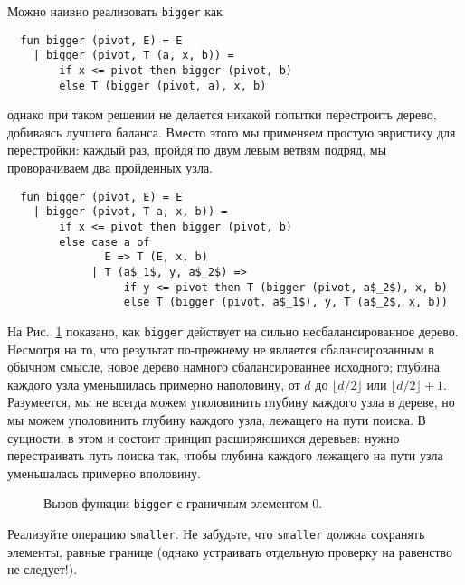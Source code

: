 Можно наивно реализовать \lstinline!bigger! как
\begin{lstlisting}
  fun bigger (pivot, E) = E
    | bigger (pivot, T (a, x, b)) =
        if x <= pivot then bigger (pivot, b)
        else T (bigger (pivot, a), x, b)
\end{lstlisting}
однако при таком решении не делается никакой попытки перестроить
дерево, добиваясь лучшего баланса.  Вместо этого мы применяем простую
эвристику для перестройки: каждый раз, пройдя по двум левым ветвям
подряд, мы проворачиваем два пройденных узла.
\begin{lstlisting}
  fun bigger (pivot, E) = E
    | bigger (pivot, T a, x, b)) =
        if x <= pivot then bigger (pivot, b)
        else case a of
               E => T (E, x, b)
             | T (a$_1$, y, a$_2$) =>
                  if y <= pivot then T (bigger (pivot, a$_2$), x, b)
                  else T (bigger (pivot. a$_1$), y, T (a$_2$, x, b))
\end{lstlisting}
На Рис.~\ref{fig:5.4} показано, как \lstinline!bigger! действует на
сильно несбалансированное дерево. Несмотря на то, что результат
по-прежнему не является сбалансированным в обычном смысле, новое
дерево намного сбалансированнее исходного; глубина каждого узла
уменьшилась примерно наполовину, от $d$ до $\lfloor d/2 \rfloor$ или
$\lfloor d/2 \rfloor + 1$. Разумеется, мы не всегда можем уполовинить
глубину каждого узла в дереве, но мы можем уполовинить глубину каждого
узла, лежащего на пути поиска. В сущности, в этом и состоит принцип
расширяющихся деревьев: нужно перестраивать путь поиска так, чтобы
глубина каждого лежащего на пути узла уменьшалась примерно вполовину.

\begin{figure}
  \centering
  
  \caption{Вызов функции \lstinline!bigger! с граничным элементом 0.}
  \label{fig:5.4}
\end{figure}

\begin{exercise}\label{ex:5.4}
  Реализуйте операцию \lstinline!smaller!. Не забудьте, что
  \lstinline!smaller! должна сохранять элементы, равные границе (однако
   устраивать отдельную проверку на равенство не следует!).
\end{exercise}

